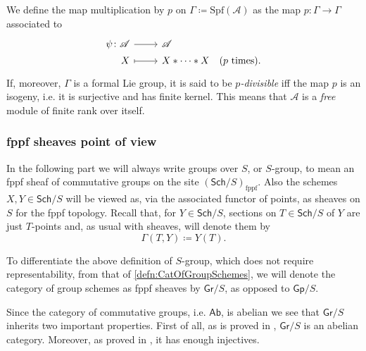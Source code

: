 \begin{defn}\label{defn:pDivisibleFormalLieGroup}
	We define the map multiplication by $p$ on $\Gamma \coloneqq \mathrm{Spf}(\mathscr{A})$
	as the map $p\colon \Gamma \to \Gamma$
	associated to 
	\begin{equation*}
	\begin{tikzcd}[row sep = 0ex
		,/tikz/column 1/.append style={anchor=base east}
		,/tikz/column 2/.append style={anchor=base west}]
		\psi\colon \mathscr{A} \arrow[r, "", rightarrow] &
		\mathscr{A} \\ %
		X \arrow[r, "", mapsto] & 
		X \ast \cdots \ast X
	\quad \text{($p$ times)}
	.\end{tikzcd}
	\end{equation*} 
	If, moreover, $\Gamma$ is a formal Lie group, 
	it is said to be {\em $p$-divisible} iff the map $p$ is 
	an isogeny, i.e. it is surjective and has finite kernel.
	This means that $\mathscr{A}$ is a {\em free} module of finite rank over itself.
\end{defn}



\subsubsection{fppf sheaves point of view}
In the following part we will always write groups over $S$, or $S$-group, to mean
an fppf sheaf of commutative groups on the site $(\mathsf{Sch}/S)_{\mathrm{fppf}}$.
Also the schemes $X, Y \in \mathsf{Sch}/S$ will be viewed as, via the associated
functor of points, as sheaves on $S$ for the fppf topology.
Recall that, for $Y \in \mathsf{Sch}/S$, sections on
$T \in \mathsf{Sch}/S$ of $Y$ are just $T$-points and,
as usual with sheaves, will denote them by
\begin{equation*}
	\Gamma \left( T, Y \right) \coloneqq Y(T)
.\end{equation*}


\begin{ntt}[]\label{not:GrS} 
	To differentiate the above definition of $S$-group,
	which does not require representability, from that of \cref{defn:CatOfGroupSchemes}, we will
	denote the category of group schemes as fppf sheaves by $\mathsf{Gr}/S$,
	as opposed to $\mathsf{Gp}/S$.
\end{ntt}


\begin{rem}[]\label{rem:PropertiesGrS}
	Since the category of commutative groups, i.e. $\mathsf{Ab}$, is
	abelian we see that $\mathsf{Gr}/S$ inherits two important properties.
	First of all, as is proved in 
	\cite[\href{https://stacks.math.columbia.edu/tag/03CN}{Lemma 03CN}]{SP},
	$\mathsf{Gr}/S$ is an abelian category.
	Moreover, as proved in 
	\cite[\href{https://stacks.math.columbia.edu/tag/01DP}{Theorem 01DP}]{SP},
	it has enough injectives.
\end{rem}


